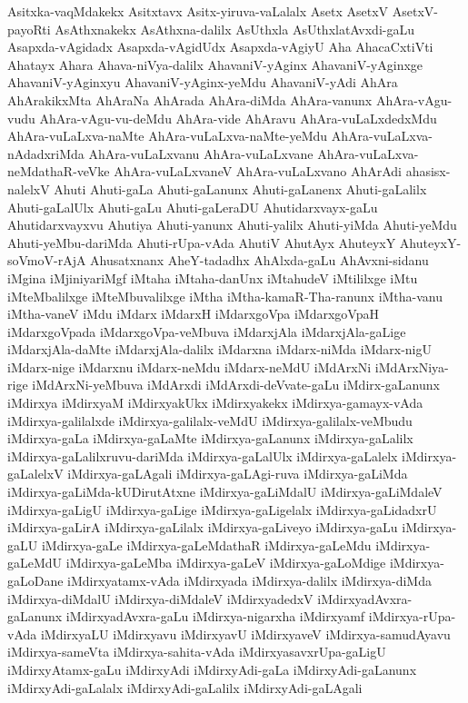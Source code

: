 {Asitxka-vaqMdakekx
Asitxtavx
Asitx-yiruva-vaLalalx
Asetx
AsetxV
AsetxV-payoRti
AsAthxnakekx
AsAthxna-dalilx
AsUthxla
AsUthxlatAvxdi-gaLu
Asapxda-vAgidadx
Asapxda-vAgidUdx
Asapxda-vAgiyU
Aha
AhacaCxtiVti
Ahatayx
Ahara
Ahava-niVya-dalilx
AhavaniV-yAginx
AhavaniV-yAginxge
AhavaniV-yAginxyu
AhavaniV-yAginx-yeMdu
AhavaniV-yAdi
AhAra
AhArakikxMta
AhAraNa
AhArada
AhAra-diMda
AhAra-vanunx
AhAra-vAgu-vudu
AhAra-vAgu-vu-deMdu
AhAra-vide
AhAravu
AhAra-vuLaLxdedxMdu
AhAra-vuLaLxva-naMte
AhAra-vuLaLxva-naMte-yeMdu
AhAra-vuLaLxva-nAdadxriMda
AhAra-vuLaLxvanu
AhAra-vuLaLxvane
AhAra-vuLaLxva-neMdathaR-veVke
AhAra-vuLaLxvaneV
AhAra-vuLaLxvano
AhArAdi
ahasisx-nalelxV
Ahuti
Ahuti-gaLa
Ahuti-gaLanunx
Ahuti-gaLanenx
Ahuti-gaLalilx
Ahuti-gaLalUlx
Ahuti-gaLu
Ahuti-gaLeraDU
Ahutidarxvayx-gaLu
Ahutidarxvayxvu
Ahutiya
Ahuti-yanunx
Ahuti-yalilx
Ahuti-yiMda
Ahuti-yeMdu
Ahuti-yeMbu-dariMda
Ahuti-rUpa-vAda
AhutiV
AhutAyx
AhuteyxY
AhuteyxY-soVmoV-rAjA
Ahusatxnanx
AheY-tadadhx
AhAlxda-gaLu
AhAvxni-sidanu
iMgina
iMjiniyariMgf
iMtaha
iMtaha-danUnx
iMtahudeV
iMtililxge
iMtu
iMteMbalilxge
iMteMbuvalilxge
iMtha
iMtha-kamaR-Tha-ranunx
iMtha-vanu
iMtha-vaneV
iMdu
iMdarx
iMdarxH
iMdarxgoVpa
iMdarxgoVpaH
iMdarxgoVpada
iMdarxgoVpa-veMbuva
iMdarxjAla
iMdarxjAla-gaLige
iMdarxjAla-daMte
iMdarxjAla-dalilx
iMdarxna
iMdarx-niMda
iMdarx-nigU
iMdarx-nige
iMdarxnu
iMdarx-neMdu
iMdarx-neMdU
iMdArxNi
iMdArxNiya-rige
iMdArxNi-yeMbuva
iMdArxdi
iMdArxdi-deVvate-gaLu
iMdirx-gaLanunx
iMdirxya
iMdirxyaM
iMdirxyakUkx
iMdirxyakekx
iMdirxya-gamayx-vAda
iMdirxya-galilalxde
iMdirxya-galilalx-veMdU
iMdirxya-galilalx-veMbudu
iMdirxya-gaLa
iMdirxya-gaLaMte
iMdirxya-gaLanunx
iMdirxya-gaLalilx
iMdirxya-gaLalilxruvu-dariMda
iMdirxya-gaLalUlx
iMdirxya-gaLalelx
iMdirxya-gaLalelxV
iMdirxya-gaLAgali
iMdirxya-gaLAgi-ruva
iMdirxya-gaLiMda
iMdirxya-gaLiMda-kUDirutAtxne
iMdirxya-gaLiMdalU
iMdirxya-gaLiMdaleV
iMdirxya-gaLigU
iMdirxya-gaLige
iMdirxya-gaLigelalx
iMdirxya-gaLidadxrU
iMdirxya-gaLirA
iMdirxya-gaLilalx
iMdirxya-gaLiveyo
iMdirxya-gaLu
iMdirxya-gaLU
iMdirxya-gaLe
iMdirxya-gaLeMdathaR
iMdirxya-gaLeMdu
iMdirxya-gaLeMdU
iMdirxya-gaLeMba
iMdirxya-gaLeV
iMdirxya-gaLoMdige
iMdirxya-gaLoDane
iMdirxyatamx-vAda
iMdirxyada
iMdirxya-dalilx
iMdirxya-diMda
iMdirxya-diMdalU
iMdirxya-diMdaleV
iMdirxyadedxV
iMdirxyadAvxra-gaLanunx
iMdirxyadAvxra-gaLu
iMdirxya-nigarxha
iMdirxyamf
iMdirxya-rUpa-vAda
iMdirxyaLU
iMdirxyavu
iMdirxyavU
iMdirxyaveV
iMdirxya-samudAyavu
iMdirxya-sameVta
iMdirxya-sahita-vAda
iMdirxyasavxrUpa-gaLigU
iMdirxyAtamx-gaLu
iMdirxyAdi
iMdirxyAdi-gaLa
iMdirxyAdi-gaLanunx
iMdirxyAdi-gaLalalx
iMdirxyAdi-gaLalilx
iMdirxyAdi-gaLAgali
}
